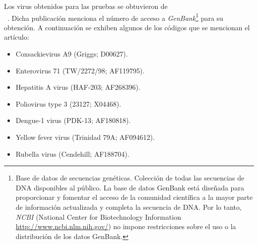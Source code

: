 	\par Los virus obtenidos para las pruebas se obtuvieron de \\
	~\cite{holme}. Dicha publicación menciona el número de acceso a \emph{GenBank}\footnote{Base de datos de secuencias genéticas. Colección de todas las secuencias de DNA disponibles al público. La base de datos GenBank está diseñada para proporcionar y fomentar el acceso de la comunidad científica a la mayor parte de información actualizada y completa la secuencia de DNA. Por lo tanto, \textit{NCBI} (National Center for Biotechnology Information \url{http://www.ncbi.nlm.nih.gov/}) no impone restricciones sobre el uso o la distribución de los datos GenBank.} para su obtención. A continuación se exhiben algunos de los códigos que se mencionan el artículo: 
	\begin{itemize}
		\item Coxsackievirus A9 (Griggs; \textsc{D00627}).
		\item Enterovirus 71 (TW/2272/98; \textsc{AF119795}).
		\item Hepatitis A virus (HAF-203; \textsc{AF268396}).
		\item Poliovirus type 3 (23127; \textsc{X04468}).
		\item Dengue-1 virus (PDK-13; \textsc{AF180818}).
		\item Yellow fever virus (Trinidad 79A; \textsc{AF094612}).
		\item Rubella virus (Cendehill; \textsc{AF188704}).
	\end{itemize}

